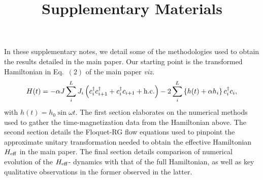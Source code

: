 \documentclass[aps,prl, notitlepage]{revtex4-1}
\begin{document}
\title{Supplementary Materials}
\maketitle
In these supplementary notes, we detail some of the methodologies used to obtain the results detailed in the main paper. Our starting point is the transformed Hamiltonian in Eq.~$(2)$ of the main paper \textit{viz.}
\begin{equation}
H(t) = - \alpha J \sum_{i}^{L}  J_i \left(c^{\dagger}_i c^{\dagger}_{i+1} + c^{\dagger}_i c_{i+1}  + {\rm h.c.}\right)
- 2 \sum_i^{L} \left\{h(t)+\alpha h_i\right\} c^{\dagger}_i c_i,
\label{H_Fermi:suppl}
\end{equation}
with $h(t)=h_0\sin{\omega t}$. The first section elaborates on the numerical methods used to gather the time-magnetization data from the Hamiltonian above. The second section details the Floquet-RG flow equations used to pinpoint the approximate unitary transformation needed to obtain the effective Hamiltonian $H_{\rm eff}$ in the main paper. The final section details comparison of numerical evolution of the $H_{\rm eff}$- dynamics with that of the full Hamiltonian, as well as key qualitative observations in the former observed in the latter.
\end{document}
